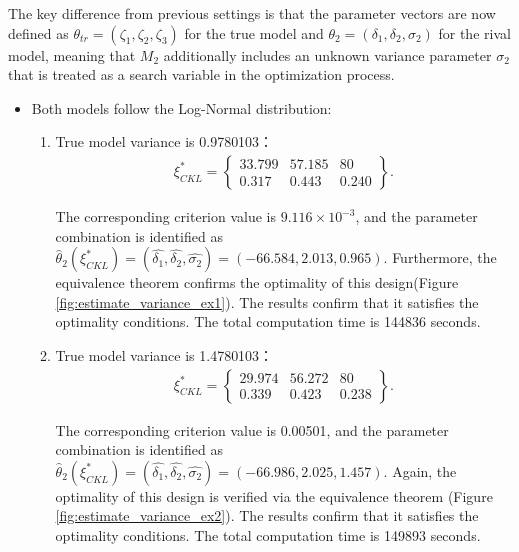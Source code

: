 \hspace*{8mm} The key difference from previous settings is that the parameter vectors are now defined as $\theta_{tr}=(\zeta_1,\zeta_2,\zeta_3)$ for the true model and $\theta_2=(\delta_1,\delta_2,\sigma_2)$ for the rival model, meaning that $M_2$ additionally includes an unknown variance parameter $\sigma_2$ that is treated as a search variable in the optimization process.

\begin{itemize}
\item Both models follow the Log-Normal distribution:

\begin{enumerate}

\item True model variance is 0.9780103：
\begin{align*}
\xi^*_{CKL} = \left\{\begin{array}{ccc}
33.799 & 57.185 & 80 \\
0.317 & 0.443 & 0.240
\end{array}\right\}.
\end{align*}

The corresponding criterion value is $9.116\times 10^{-3}$, and the parameter combination is identified as $\hat{\theta}_2(\xi^*_{CKL})=(\hat{\delta_1},\hat{\delta_2},\hat{\sigma_2})=(-66.584, 2.013, 0.965)$. Furthermore, the equivalence theorem confirms the optimality of this design(Figure \ref{fig:estimate_variance_ex1}). The results confirm that it satisfies the optimality conditions. The total computation time is 144836 seconds.

\item True model variance is 1.4780103：
\begin{align*}
\xi^*_{CKL} = \left\{\begin{array}{ccc}
29.974 & 56.272 & 80 \\
0.339 & 0.423 & 0.238
\end{array}\right\}.
\end{align*}

The corresponding criterion value is 0.00501, and the parameter combination is identified as $\hat{\theta}_2(\xi^*_{CKL})=(\hat{\delta_1},\hat{\delta_2},\hat{\sigma_2})=(-66.986, 2.025, 1.457)$. Again, the optimality of this design is verified via the equivalence theorem (Figure \ref{fig:estimate_variance_ex2}). The results confirm that it satisfies the optimality conditions. The total computation time is 149893 seconds.


\end{enumerate}
\end{itemize}
